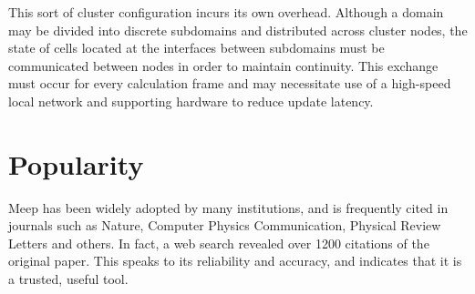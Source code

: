 This sort of cluster configuration incurs its own overhead. Although a domain may be divided into discrete subdomains and distributed across cluster nodes, the state of cells located at the interfaces between subdomains must be communicated between nodes in order to maintain continuity. This exchange must occur for every calculation frame and may necessitate use of a high-speed local network and supporting hardware to reduce update latency.

\section{Popularity}

Meep has been widely adopted by many institutions, and is frequently cited in journals such as Nature\cite{vynck2012photon}\cite{krogstrup2013single}, Computer Physics Communication\cite{liu2012s}, Physical Review Letters\cite{levin2010casimir} and others. In fact, a web search revealed over 1200 citations of the original\cite{OskooiRo10} paper. This speaks to its reliability and accuracy, and indicates that it is a trusted, useful tool.








